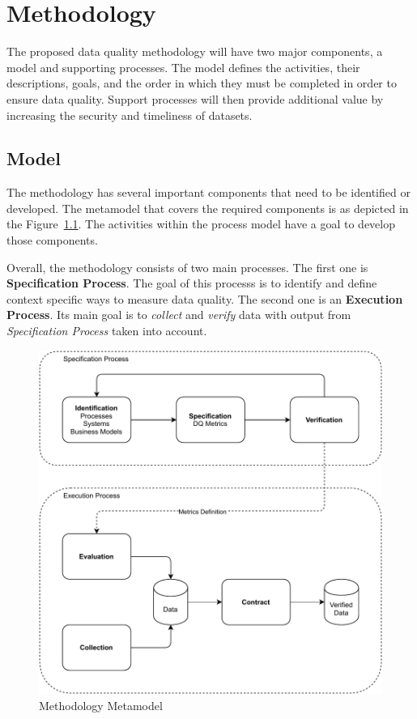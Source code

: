 \chapter{Methodology}\label{ch:methodology}

The proposed data quality methodology will have two major components, a model and supporting processes.
The model defines the activities, their descriptions, goals, and the order in which they must be completed in order to ensure data quality.
Support processes will then provide additional value by increasing the security and timeliness of datasets.

\section{Model}

The methodology has several important components that need to be identified or developed.
The metamodel that covers the required components is as depicted in the Figure~\ref{fig:methodology-metamodel}.
The activities within the process model have a goal to develop those components.

Overall, the methodology consists of two main processes.
The first one is \textbf{Specification Process}.
The goal of this processs is to identify and define context specific ways to measure data quality.
The second one is an \textbf{Execution Process}.
Its main goal is to \textit{collect} and \textit{verify} data with output from \textit{Specification Process} taken into account.

\begin{figure}[htb]
    \centering
    \includegraphics[width=.8\textwidth]{figures/dq-methodology.pdf}
    \caption{Methodology Metamodel}
    \label{fig:methodology-metamodel}
\end{figure}
\FloatBarrier

